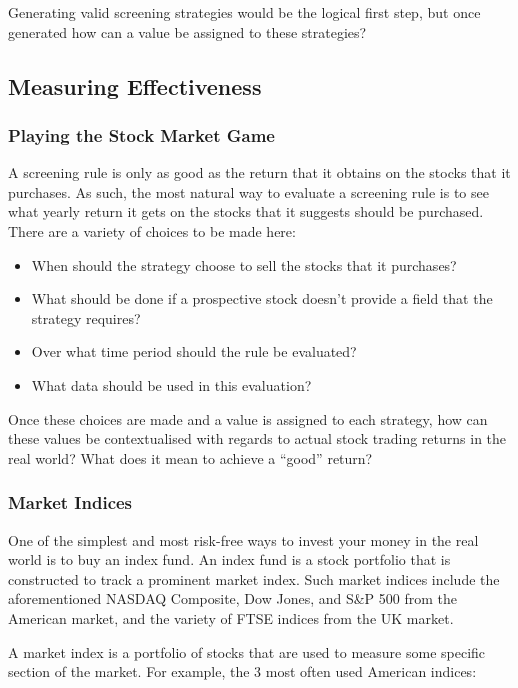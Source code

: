 Generating valid screening strategies would be the logical first step, but once generated how can a value be assigned to these strategies?

\subsection{Measuring Effectiveness}
\subsubsection{Playing the Stock Market Game}
A screening rule is only as good as the return that it obtains on the stocks that it purchases. As such, the most natural way to evaluate a screening rule is to see what yearly return it gets on the stocks that it suggests should be purchased. There are a variety of choices to be made here:
\begin{itemize}
    \item When should the strategy choose to sell the stocks that it purchases?
    \vspace{-2mm}
    \item What should be done if a prospective stock doesn't provide a field that the strategy requires?
    \vspace{-2mm}
    \item Over what time period should the rule be evaluated?
    \vspace{-2mm}
    \item What data should be used in this evaluation?
\end{itemize}

Once these choices are made and a value is assigned to each strategy, how can these values be contextualised with regards to actual stock trading returns in the real world? What does it mean to achieve a ``good'' return?

\subsubsection{Market Indices}
One of the simplest and most risk-free ways to invest your money in the real world is to buy an index fund. An index fund is a stock portfolio that is constructed to track a prominent market index. Such market indices include the aforementioned NASDAQ Composite, Dow Jones, and S\&P 500 from the American market, and the variety of FTSE indices from the UK market. \newline

A market index is a portfolio of stocks that are used to measure some specific section of the market. For example, the 3 most often used American indices: 

